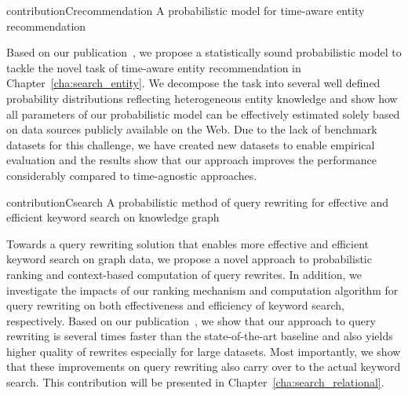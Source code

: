 \begin{restatable}{contribution}{Crecommendation} \label{c:recommendation}
A probabilistic model for time-aware entity recommendation 
\end{restatable}
\vspace{-0.9em}
\noindent Based on our publication~\cite{}, we propose a statistically sound probabilistic model to tackle the novel task of time-aware entity recommendation in Chapter~\ref{cha:search_entity}. We decompose the task into several well defined probability distributions reflecting heterogeneous entity knowledge and show how all parameters of our probabilistic model can be effectively estimated solely based on data sources publicly available on the Web. Due to the lack of benchmark datasets for this challenge, we have created new datasets to enable empirical evaluation and the results show that our approach improves the performance considerably compared to time-agnostic approaches. 


\begin{restatable}{contribution}{Csearch} \label{c:search}
A probabilistic method of query rewriting for effective and efficient keyword search on knowledge graph
\end{restatable}
\vspace{-0.9em}
\noindent Towards a query rewriting solution that enables more  effective and efficient keyword search on graph data, 
we propose a novel approach to probabilistic ranking and context-based computation of query rewrites. In addition, we investigate the impacts of our ranking mechanism and computation algorithm for query rewriting on both effectiveness and efficiency of keyword search, respectively.
Based on our publication~\cite{}, we show that our approach to query rewriting is several times faster than the state-of-the-art baseline and also yields higher quality of rewrites especially for large datasets. Most importantly, we show that these improvements on query rewriting also carry over to the actual keyword search. This contribution will be presented in Chapter~\ref{cha:search_relational}.

